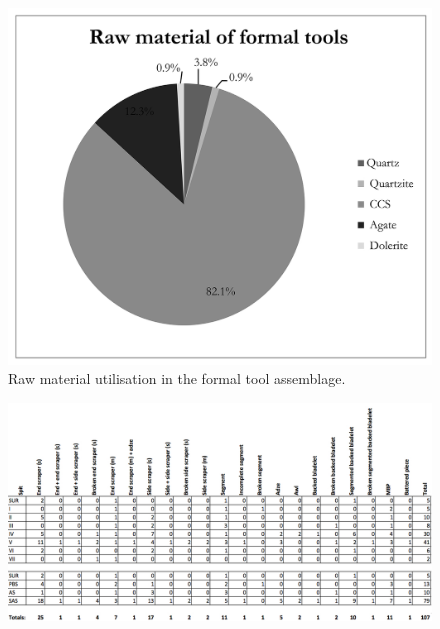 \documentclass{ijsra}
\begin{document}
		\begin{figure} %
			\includegraphics[width=\linewidth]{figures/Forssman-Figure06}
			\caption{Raw material utilisation in the formal tool assemblage.}
			\label{fig:Forssman-Figure06}
		\end{figure}
	
	\begin{figure} %
		\includegraphics[width=\linewidth]{figures/Forssman-Table03}
		\label{fig:Forssman-Table03}
	\end{figure}
   
\end{document}
